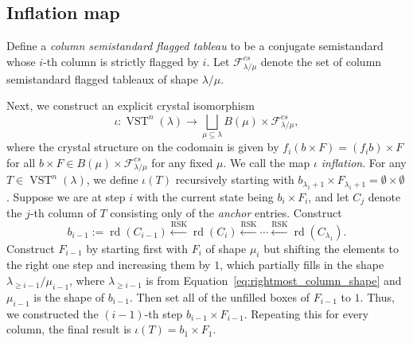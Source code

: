 \documentclass[ALCO,ThmDefs,Unicode,epreuves]{cedram}
\DeclareMathOperator{\rd}{rd} %
\DeclareMathOperator{\vst}{VST} %
\DeclareMathOperator{\RSK}{RSK} %
\newcommand{\mcF}{\mathcal{F}}
\newcommand{\defn}[1]{{\color{darkred}\emph{#1}}} %
\begin{document}
\subsection{Inflation map}

Define a \defn{column semistandard flagged tableau} to be a conjugate semistandard whose $i$-th column is strictly flagged by $i$. Let $\mcF^{cs}_{\lambda/\mu}$ denote the set of column semistandard flagged tableaux of shape $\lambda/\mu$.

Next, we construct an explicit crystal isomorphism
\[
\iota \colon \vst^n(\lambda) \to \bigsqcup_{\mu \subseteq \lambda} B(\mu) \times \mcF^{cs}_{\lambda/\mu},
\]
where the crystal structure on the codomain is given by $f_i(b \times F) = (f_i b) \times F$ for all $b \times F \in B(\mu) \times \mcF^{cs}_{\lambda/\mu}$ for any fixed $\mu$.
We call the map $\iota$ \defn{inflation}.
For any $T \in \vst^n(\lambda)$, we define $\iota(T)$ recursively starting with $b_{\lambda_1+1} \times F_{\lambda_1+1} = \emptyset \times \emptyset$. Suppose we are at step $i$ with the current state being $b_i \times F_i$, and let $C_j$ denote the $j$-th column of $T$ consisting only of the \emph{anchor} entries. Construct
\[
b_{i-1} := \rd(C_{i-1}) \xleftarrow{\RSK} \rd(C_i) \xleftarrow{\RSK} \cdots \xleftarrow{\RSK} \rd(C_{\lambda_1}).
\]
Construct $F_{i-1}$ by starting first with $F_i$ of shape $\mu_i$ but shifting the elements to the right one step and increasing them by $1$, which partially fills in the shape $\lambda_{\geq i-1} / \mu_{i-1}$, where $\lambda_{\geq i-1}$ is from Equation~\eqref{eq:rightmost_column_shape} and $\mu_{i-1}$ is the shape of $b_{i-1}$.
Then set all of the unfilled boxes of $F_{i-1}$ to $1$. Thus, we constructed the $(i-1)$-th step $b_{i-1} \times F_{i-1}$. Repeating this for every column, the final result is $\iota(T) = b_1 \times F_1$.
\end{document}
